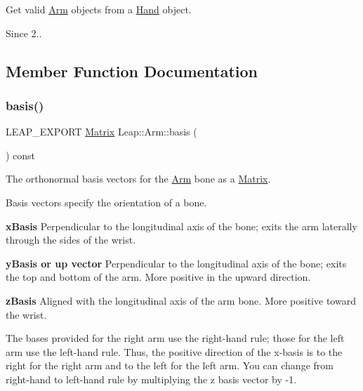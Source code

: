 Get valid \hyperlink{class_leap_1_1_arm}{Arm} objects from a \hyperlink{class_leap_1_1_hand}{Hand} object.


\begin{DoxyCodeInclude}
\end{DoxyCodeInclude}


\begin{DoxySince}{Since}
2.. 
\end{DoxySince}


\subsection{Member Function Documentation}
\mbox{\label{class_leap_1_1_arm_aa08418804add6ed37c5520015123c716}} 
\subsubsection{\texorpdfstring{basis()}{basis()}}
{\footnotesize\ttfamily L\+E\+A\+P\+\_\+\+E\+X\+P\+O\+RT \hyperlink{struct_leap_1_1_matrix}{Matrix} Leap\+::\+Arm\+::basis (\begin{DoxyParamCaption}{ }\end{DoxyParamCaption}) const}

The orthonormal basis vectors for the \hyperlink{class_leap_1_1_arm}{Arm} bone as a \hyperlink{struct_leap_1_1_matrix}{Matrix}.

Basis vectors specify the orientation of a bone.

{\bfseries x\+Basis} Perpendicular to the longitudinal axis of the bone; exits the arm laterally through the sides of the wrist.

{\bfseries y\+Basis or up vector} Perpendicular to the longitudinal axis of the bone; exits the top and bottom of the arm. More positive in the upward direction.

{\bfseries z\+Basis} Aligned with the longitudinal axis of the arm bone. More positive toward the wrist.


\begin{DoxyCodeInclude}
\end{DoxyCodeInclude}


The bases provided for the right arm use the right-\/hand rule; those for the left arm use the left-\/hand rule. Thus, the positive direction of the x-\/basis is to the right for the right arm and to the left for the left arm. You can change from right-\/hand to left-\/hand rule by multiplying the z basis vector by -\/1.


